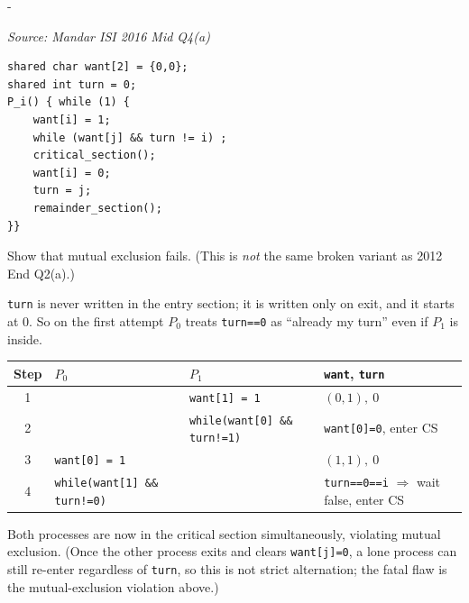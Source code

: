 \documentclass[11pt,a4paper]{article}
\makeatletter
\newcommand{\keepspace}[1]{\par\penalty-100\begingroup
  \setlength{\dimen@}{#1}\dimen@ii\pagegoal\advance\dimen@ii-\pagetotal
  \ifdim\dimen@>\dimen@ii\ifdim\dimen@ii>\z@\vfil\fi\break\fi\endgroup}
\newcounter{qn}[section]
\newenvironment{Qn}[4]{%
  \refstepcounter{qn}\keepspace{7\baselineskip}%
  \begin{tcolorbox}[qboxstyle, title={Q\thesection.\theqn\ \ [#1 \textbar\ #2]\ \ #4}]%
  {\footnotesize\color{g3}\textit{Source: #3}}\par\smallskip%
}{%
  \end{tcolorbox}%
}
\newenvironment{Sol}{%
  \begin{tcolorbox}[sboxstyle, title={Solution}]%
}{%
  \end{tcolorbox}\vspace{0.35em}%
}
\makeatother
\begin{document}
\begin{Qn}{Hard}{Lect 17}{Mandar ISI 2016 Mid Q4(a)}{Another broken Peterson: flag first, \texttt{turn} only after the CS}
\begin{lstlisting}[numbers=none]
shared char want[2] = {0,0};
shared int turn = 0;
P_i() { while (1) {
    want[i] = 1;
    while (want[j] && turn != i) ;
    critical_section();
    want[i] = 0;
    turn = j;
    remainder_section();
}}
\end{lstlisting}

Show that mutual exclusion fails. (This is \emph{not} the same broken variant as 2012 End Q2(a).)
\end{Qn}
\begin{Sol}
\texttt{turn} is never written in the entry section; it is written only on exit, and it starts at 0. So on the first attempt $P_0$ treats \texttt{turn==0} as ``already my turn'' even if $P_1$ is inside.

\begin{center}
\small
\begin{tabularx}{\linewidth}{@{}c|l|l|X@{}}
Step & $P_0$ & $P_1$ & \texttt{want}, \texttt{turn} \\
\hline
1 & & \texttt{want[1] = 1} & $(0,1),\ 0$ \\
2 & & \texttt{while(want[0] \&\& turn!=1)} & \texttt{want[0]=0}, enter CS \\
3 & \texttt{want[0] = 1} & & $(1,1),\ 0$ \\
4 & \texttt{while(want[1] \&\& turn!=0)} & &
    \texttt{turn==0==i} $\Rightarrow$ wait false, enter CS \\
\end{tabularx}
\end{center}

Both processes are now in the critical section simultaneously, violating mutual exclusion. (Once the other process exits and clears \texttt{want[j]=0}, a lone process can still re-enter regardless of \texttt{turn}, so this is not strict alternation; the fatal flaw is the mutual-exclusion violation above.)
\end{Sol}
\end{document}
